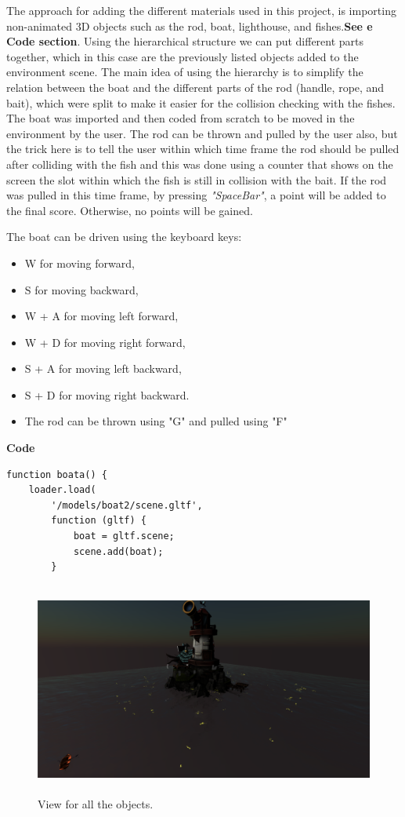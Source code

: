 \documentclass[paper=a4, fontsize=11pt]{scrartcl} %
\numberwithin{equation}{section} %
\numberwithin{figure}{section} %
\numberwithin{table}{section} %
\begin{document}
The approach for adding the different materials used in this project, is importing non-animated 3D objects such as the rod, boat, lighthouse, and fishes.\textbf{See e Code section}.
Using the hierarchical structure we can put different parts together, which in this case are the previously listed objects added to the environment scene. The main idea of using the hierarchy is to simplify the relation between the boat and the different parts of the rod (handle, rope, and bait), which were split to make it easier for the collision checking with the fishes. The boat was imported and then coded from scratch to be moved in the environment by the user. The rod can be thrown and pulled by the user also, but the trick here is to tell the user within which time frame the rod should be pulled after colliding with the fish and this was done using a counter that shows on the screen the slot within which the fish is still in collision with the bait. If the rod was pulled in this time frame, by pressing \textit{"SpaceBar"}, a point will be added to the final score. Otherwise, no points will be gained.\par
The boat can be driven using the keyboard keys:
\begin{itemize}
\item W for moving forward,
\item S for moving backward,
\item W + A for moving left forward,
\item W + D for moving right forward,
\item S + A for moving left backward,
\item S + D for moving right backward.
\item The rod can be thrown using "G" and pulled using "F" 
\end{itemize}
\newpage
\textbf{Code}
\begin{verbatim}
function boata() {
    loader.load(
        '/models/boat2/scene.gltf',
        function (gltf) {
            boat = gltf.scene;
            scene.add(boat);
        }
\end{verbatim}

\begin{figure}[!ht]
\centering
\includegraphics[width=15cm, height=7cm]{images/lighthouse.png}
\caption{View for all the objects.}
\label{house}
\end{figure}
\end{document}
